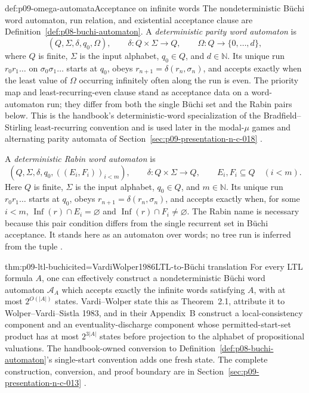 \begin{hbdefinition}{def:p09-omega-automata}{Acceptance on infinite words}
The nondeterministic B\"uchi word automaton, run relation, and existential
acceptance clause are Definition~\ref{def:p08-buchi-automaton}.  A
\emph{deterministic parity word automaton} is
\[
 (Q,\Sigma,\delta,q_0,\Omega),
 \qquad
 \delta:Q\times\Sigma\to Q,
 \qquad
 \Omega:Q\to\{0,\ldots,d\},
\]
where \(Q\) is finite, \(\Sigma\) is the input alphabet, \(q_0\in Q\), and
\(d\in\mathbb N\).  Its unique run
\(r_0r_1\ldots\) on \(\sigma_0\sigma_1\ldots\) starts at \(q_0\), obeys
\(r_{n+1}=\delta(r_n,\sigma_n)\), and accepts exactly when the least value of
\(\Omega\) occurring infinitely often along the run is even.  The priority map
and least-recurring-even clause stand as acceptance data on a word-automaton
run; they differ from both the single B\"uchi set and the Rabin pairs below.
This is the handbook's deterministic-word specialization of the
Bradfield--Stirling least-recurring convention and is used later in the
modal-\(\mu\) games and alternating parity automata of
Section~\ref{sec:p09-presentation-n-c-018}
\cite[\S\S4--5]{BradfieldStirling2007}.

A \emph{deterministic Rabin word automaton} is
\[
 (Q,\Sigma,\delta,q_0,((E_i,F_i))_{i<m}),
 \qquad
 \delta:Q\times\Sigma\to Q,
 \qquad
 E_i,F_i\subseteq Q\quad(i<m).
\]
Here \(Q\) is finite, \(\Sigma\) is the input alphabet, \(q_0\in Q\), and
\(m\in\mathbb N\).
Its unique run \(r_0r_1\ldots\) starts at \(q_0\), obeys
\(r_{n+1}=\delta(r_n,\sigma_n)\), and accepts exactly when, for some \(i<m\),
\(\operatorname{Inf}(r)\cap E_i=\varnothing\) and
\(\operatorname{Inf}(r)\cap F_i\ne\varnothing\).  The Rabin name is necessary
because this pair condition differs from the single recurrent set in B\"uchi
acceptance.  It stands here as an automaton over words; no tree run is inferred
from the tuple \cite[Def.~5.1]{Thomas1996Report}.
\end{hbdefinition}

\begin{hbtheorem}{thm:p09-ltl-buchi}{cited=VardiWolper1986}{LTL-to-B\"uchi translation}
For every LTL formula \(A\), one can effectively construct a nondeterministic
B\"uchi word automaton \(\mathcal A_A\) which accepts exactly the infinite
words satisfying \(A\), with at most \(2^{O(|A|)}\) states.  Vardi--Wolper
state this as Theorem~2.1, attribute it to Wolper--Vardi--Sistla 1983, and in
their Appendix~B construct a
local-consistency component and an eventuality-discharge component whose
permitted-start-set product has at most \(2^{3|A|}\) states before projection
to the alphabet of propositional valuations.  The handbook-owned conversion to
Definition~\ref{def:p08-buchi-automaton}'s single-start convention adds one
fresh state.  The complete construction, conversion, and proof boundary are in
Section~\ref{sec:p09-presentation-n-c-013}
\cite{WolperVardiSistla1983,VardiWolper1986}.
\end{hbtheorem}

